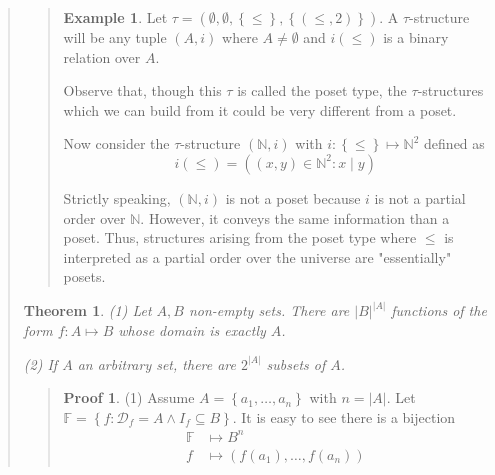 \documentclass[a4paper, 12pt]{article}
\newtheorem{theorem}{Theorem}
\theoremstyle{definition}
\theoremstyle{definition}
\newtheorem{example}{Example}
\theoremstyle{definition}
\newtheorem{pro}{Proof}
\begin{document}
\begin{quote}
\begin{quote}
\end{quote}
\normalsize


\small
\begin{quote}

\begin{example}
    Let $\tau = \left( \emptyset, \emptyset, \left\{ \leq \right\}, \left\{
    (\leq, 2) \right\}   \right) $. A $\tau$-structure will be any 
    tuple $(A, i)$ where $A \neq \emptyset$ and $i(\leq)$ is 
    a binary relation over $A$.

    Observe that, though this $\tau$ is called the poset type, 
    the $\tau$-structures which we can build from it could be 
    very different from a poset.

    Now consider the $\tau$-structure $(\mathbb{N}, i)$ with $i : \left\{ \leq \right\} \mapsto \mathbb{N}^2 $ defined as 
    \begin{equation*}
        i(\leq) = \left( (x, y) \in \mathbb{N}^2 : x \mid y \right) 
    \end{equation*}

    Strictly speaking, $(\mathbb{N}, i)$ is not a poset because $i$ is not 
    a partial order over $\mathbb{N}$. However, it conveys the same 
    information than a poset. Thus, structures arising from the 
    poset type where $\leq$ is interpreted as a partial order 
    over the universe are "essentially" posets.
\end{example}

\end{quote}
\normalsize

\begin{theorem}
    \textit{(1)} Let $A, B$ non-empty sets. There are $|B|^{|A|}$ functions 
    of the form $f : A \mapsto B$ whose domain is exactly $A$.

    \textit{(2)} If $A$ an arbitrary set, there are $2^{|A|}$ subsets 
    of $A$.
\end{theorem}


\small
\begin{quote}

\begin{pro}
    (1) Assume $A = \left\{ a_1, \ldots, a_n \right\} $ with $n = |A|$. Let 
    $\mathbb{F} = \left\{ f : \mathcal{D}_f = A \land {I}_f \subseteq B \right\} $.
    It is easy to see there is a bijection  
    \begin{align*}
        \mathbb{F} &\mapsto  B^n  \\ 
        f &\mapsto \left( f(a_1),\ldots, f(a_n) \right) 
    \end{align*}


\end{pro}
\end{quote}
\end{quote}
\end{document}
